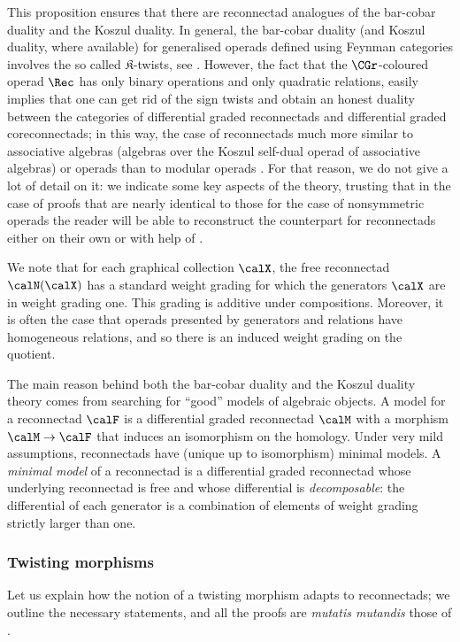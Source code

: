 This proposition ensures that there are reconnectad analogues of the bar-cobar duality and the Koszul duality. In general, the bar-cobar duality (and Koszul duality, where available) for generalised operads defined using Feynman categories involves the so called $\mathfrak{K}$-twists, see \cite{MR3636409}. However, the fact that the $\CGr$-coloured operad $\Rec$ has only binary operations and only quadratic relations, easily implies that one can get rid of the sign twists and obtain an honest duality between the categories of differential graded reconnectads and differential graded coreconnectads; in this way, the case of reconnectads much more similar to associative algebras (algebras over the Koszul self-dual operad of associative algebras) or operads \cite{VanDerLaan03} than to modular operads \cite{DSVV,MR4425832}. For that reason, we do not give a lot of detail on it: we indicate some key aspects of the theory, trusting that in the case of proofs that are nearly identical to those for the case of nonsymmetric operads the reader will be able to reconstruct the counterpart for reconnectads either on their own or with help of \cite{MR2954392}.  

We note that for each graphical collection $\calX$, the free reconnectad $\calN(\calX)$ has a standard weight grading for which the generators $\calX$ are in weight grading one. This grading is additive under compositions. Moreover, it is often the case that operads presented by generators and relations have homogeneous relations, and so there is an induced weight grading on the quotient. 

The main reason behind both the bar-cobar duality and the Koszul duality theory comes from searching for ``good'' models of algebraic objects. A model for a reconnectad $\calF$ is a differential graded reconnectad $\calM$ with a morphism $\calM\to\calF$ that induces an isomorphism on the homology. Under very mild assumptions, reconnectads have (unique up to isomorphism) minimal models. A \emph{minimal model} of a reconnectad is a differential graded reconnectad whose underlying reconnectad is free and whose differential is \emph{decomposable}: the differential of each generator is a combination of elements of weight grading strictly larger than one.

\subsubsection{Twisting morphisms}

Let us explain how the notion of a twisting morphism adapts to reconnectads; we outline the necessary statements, and all the proofs are \emph{mutatis mutandis} those of \cite[Sec.~6.4]{MR2954392}. 

